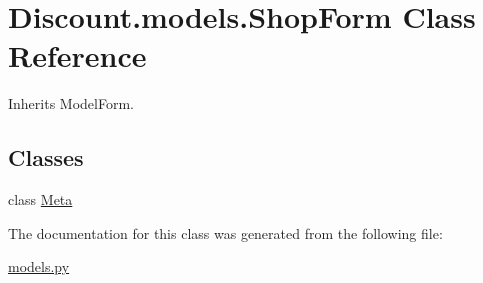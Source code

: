 \hypertarget{class_discount_1_1models_1_1_shop_form}{}\section{Discount.\+models.\+Shop\+Form Class Reference}
\label{class_discount_1_1models_1_1_shop_form}


Inherits Model\+Form.

\subsection*{Classes}
\begin{DoxyCompactItemize}
\item 
class \hyperlink{class_discount_1_1models_1_1_shop_form_1_1_meta}{Meta}
\end{DoxyCompactItemize}


The documentation for this class was generated from the following file\+:\begin{DoxyCompactItemize}
\item 
\hyperlink{models_8py}{models.\+py}\end{DoxyCompactItemize}
